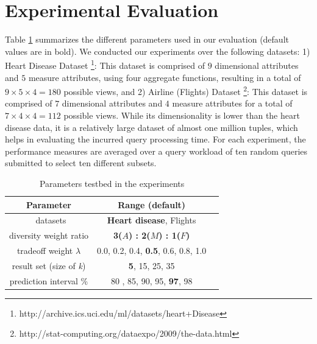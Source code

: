 
\section{Experimental Evaluation}\label{sec:experimental_testbed}

%
Table \ref{tab:tab-parameter} summarizes the different parameters used in our evaluation (default values are in bold).  
%
We conducted our experiments over the following datasets: 1) Heart Disease Dataset \footnote{http://archive.ics.uci.edu/ml/datasets/heart+Disease}: This dataset is comprised of $9$ dimensional attributes and $5$ measure attributes, using four aggregate functions, resulting in a total of $9\times 5\times 4 = 180 $ possible views, and 2) Airline (Flights) Dataset \footnote{http://stat-computing.org/dataexpo/2009/the-data.html}: This dataset is comprised of $7$ dimensional attributes and $4$ measure attributes for a total of $7\times 4\times 4 = 112$ possible views. While its dimensionality is lower than the heart disease data, it is a relatively large dataset of almost one million tuples, which helps in evaluating the incurred query processing time.
%
For each experiment, the performance measures are averaged over a query workload of ten random queries submitted to select ten different subsets. 
%


\begin{table}[t]
	\caption{Parameters testbed in the experiments}
	\label{tab:tab-parameter}
	\begin{tabular}{ccl}
		\toprule
		Parameter &Range (\textbf{default})\\
		\midrule\
		datasets & \textbf{Heart disease}, Flights\\
		diversity weight ratio & \textbf{3($ A $) : 2($ M $) : 1($ F $)} \\
		tradeoff weight $ \lambda $ & 0.0, 0.2, 0.4, \textbf{0.5}, 0.6, 0.8, 1.0 \\
		result set (size of \textit{k}) & \textbf{5}, 15, 25, 35\\
		prediction interval \% & 80 , 85, 90, 95, \textbf{97}, 98\\
		\bottomrule
	\end{tabular}
		\vspace{-8pt}
\end{table}



